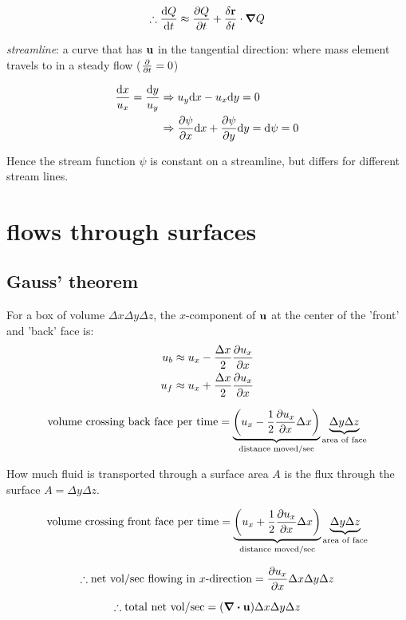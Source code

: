 \documentclass[10pt, a4paper, twocolumn]{article}
\newcommand{\deff}[1]{\par \noindent \textit{#1}: }
\begin{document}
\[\therefore
\dv{Q}{t}\approx
\pdv{Q}{t}+\frac{\delta\vb r}{\delta t}
\cdot \grad Q\]

\deff{streamline}
a curve that has $\vb u$ in the tangential direction: where mass element travels to in a steady flow ($\pdv{t}=0$)

\begin{equation*}
\begin{aligned}
\frac{\dd x}{u_x}=\frac{\dd y}{u_y}
&\Rightarrow
u_y\dd x-u_x \dd y=0
\\&\Rightarrow
\pdv{\psi}{x}\dd x+
\pdv{\psi}{y}\dd y = \dd \psi =0
\end{aligned}
\end{equation*}

Hence the stream function $\psi$ is constant on a streamline, but differs for different stream lines.

\section{flows through surfaces}
\subsection{Gauss' theorem}

For a box of volume $\Delta x\Delta y\Delta z$, the $x$-component of $\vb u$ at the center of the 'front' and 'back' face is:
\begin{equation*}
\begin{aligned}
u_b&\approx u_x-\frac{\Delta x}{2}\pdv{u_x}{x}
\\u_f&\approx u_x+\frac{\Delta x}{2}\pdv{u_x}{x}
\end{aligned}
\end{equation*}

\[\text{volume crossing back face per time}
=\underbrace{\pqty{u_x-\frac12\pdv{u_x}{x}\Delta x}}
_\text{distance moved/sec}
\underbrace{\Delta y\Delta z}
_\text{area of face}\]

How much fluid is transported through a surface area $A$ is the flux through the surface $A=\Delta y\Delta z$.

\[\text{volume crossing front face per time}
=\underbrace{\pqty{u_x+\frac12\pdv{u_x}{x}\Delta x}}
_\text{distance moved/sec}
\underbrace{\Delta y\Delta z}
_\text{area of face}\]

\[\therefore\text{net vol/sec flowing in $x$-direction}
=\pdv{u_x}{x}\Delta x\Delta y\Delta z\]

\[\therefore\text{total net vol/sec}
=(\div \vb u)\Delta x\Delta y\Delta z\]
\end{document}
